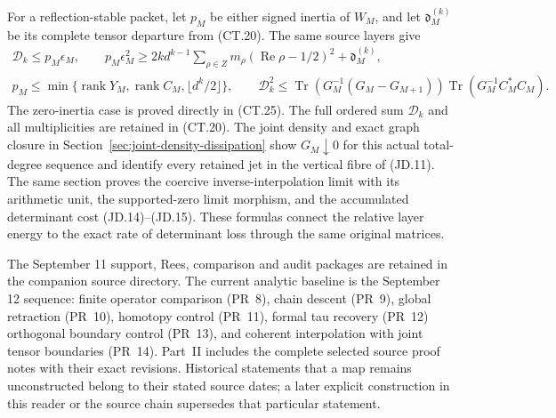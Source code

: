 For a reflection-stable packet, let \(p_M\) be either signed
inertia of \(W_M\), and let \(\mathfrak d_M^{(k)}\) be its
complete tensor departure from (CT.20).  The same source layers give
\[
 \begin{gathered}
 \mathcal D_k\le p_M\epsilon_M,\qquad
 p_M\epsilon_M^2\ge
  2kd^{k-1}\sum_{\rho\in Z}m_\rho
        (\operatorname{Re}\rho-1/2)^2+\mathfrak d_M^{(k)},\\
 p_M\le\min\{\operatorname{rank}Y_M,
              \operatorname{rank}C_M,\lfloor d^k/2\rfloor\},\qquad
 \mathcal D_k^2\le
 \operatorname{Tr}(G_M^{-1}(G_M-G_{M+1}))
 \operatorname{Tr}(G_M^{-1}C_M^*C_M).
 \end{gathered}
 \tag{R6}
\]
The zero-inertia case is proved directly in (CT.25).  The full
ordered sum \(\mathcal D_k\) and all multiplicities are retained
in (CT.20).  The joint density and exact graph closure in
Section~\ref{sec:joint-density-dissipation} show
\(G_M\downarrow0\) for this actual total-degree sequence and
identify every retained jet in the vertical fibre of (JD.11).
The same section proves the coercive inverse-interpolation limit
with its arithmetic unit, the supported-zero limit morphism, and
the accumulated determinant cost (JD.14)--(JD.15).  These formulas
connect the relative layer energy to the exact rate of determinant
loss through the same original matrices.

The September 11 support, Rees, comparison and audit packages
are retained in the companion source directory. The current
analytic baseline is the September 12 sequence: finite operator
comparison (PR~8), chain descent (PR~9), global retraction
(PR~10), homotopy control (PR~11), formal tau recovery (PR~12)
orthogonal boundary control (PR~13), and coherent interpolation
with joint tensor boundaries (PR~14).
Part~II includes the complete selected source proof notes with
their exact revisions. Historical statements that a map remains
unconstructed belong to their stated source dates; a later
explicit construction in this reader or the source chain
supersedes that particular statement.


